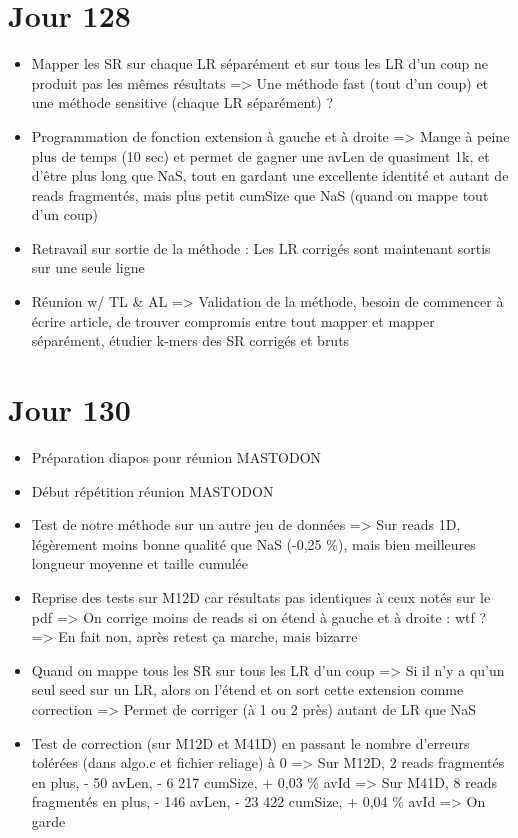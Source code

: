 \documentclass[12pt]{report}
\begin{document}
\section{Jour 128}

\begin{itemize}
	\item Mapper les SR sur chaque LR séparément et sur tous les LR d'un coup ne produit pas les mêmes résultats
		  => Une méthode fast (tout d'un coup) et une méthode sensitive (chaque LR séparément) ?
	
	\item Programmation de fonction extension à gauche et à droite
		  => Mange à peine plus de temps (10 sec) et permet de gagner une avLen de quasiment 1k, et d'être plus long que NaS, tout en gardant
		  une excellente identité et autant de reads fragmentés, mais plus petit cumSize que NaS (quand on mappe tout d'un coup)
	
	\item Retravail sur sortie de la méthode : Les LR corrigés sont maintenant sortis sur une seule ligne
	
	\item Réunion w/ TL \& AL => Validation de la méthode, besoin de commencer à écrire article, de trouver compromis entre tout mapper et 
		  mapper séparément, étudier k-mers des SR corrigés et bruts
\end{itemize}

\section{Jour 130}

\begin{itemize}
	\item Préparation diapos pour réunion MASTODON
	
	\item Début répétition réunion MASTODON
	
	\item Test de notre méthode sur un autre jeu de données => Sur reads 1D, légèrement moins bonne qualité que NaS (-0,25 \%), mais bien meilleures
		  longueur moyenne et taille cumulée
	
	\item Reprise des tests sur M12D car résultats pas identiques à ceux notés sur le pdf
		  => On corrige moins de reads si on étend à gauche et à droite : wtf ? => En fait non, après retest ça marche, mais bizarre
		  
	\item Quand on mappe tous les SR sur tous les LR d'un coup => Si il n'y a qu'un seul seed sur un LR, alors on l'étend et on sort
		  cette extension comme correction => Permet de corriger (à 1 ou 2 près) autant de LR que NaS
		  
	\item Test de correction (sur M12D et M41D) en passant le nombre d'erreurs tolérées (dans algo.c et fichier reliage) à 0
		  => Sur M12D, 2 reads fragmentés en plus, - 50 avLen, - 6 217 cumSize, + 0,03 \% avId
		  => Sur M41D, 8 reads fragmentés en plus, - 146 avLen, - 23 422 cumSize, + 0,04 \% avId
		  => On garde
\end{itemize}
\end{document}
